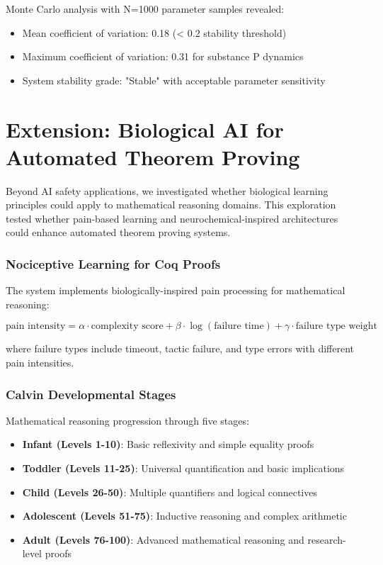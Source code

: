 \documentclass[12pt]{article}
\begin{document}
Monte Carlo analysis with N=1000 parameter samples revealed:
\begin{itemize}
\item Mean coefficient of variation: 0.18 (< 0.2 stability threshold)
\item Maximum coefficient of variation: 0.31 for substance P dynamics
\item System stability grade: "Stable" with acceptable parameter sensitivity
\end{itemize}

\section{Extension: Biological AI for Automated Theorem Proving}

Beyond AI safety applications, we investigated whether biological learning principles could apply to mathematical reasoning domains. This exploration tested whether pain-based learning and neurochemical-inspired architectures could enhance automated theorem proving systems.

\subsubsection{Nociceptive Learning for Coq Proofs}

The system implements biologically-inspired pain processing for mathematical reasoning:

\begin{equation}
\text{pain intensity} = \alpha \cdot \text{complexity score} + \beta \cdot \log(\text{failure time}) + \gamma \cdot \text{failure type weight}
\end{equation}

where failure types include timeout, tactic failure, and type errors with different pain intensities.

\subsubsection{Calvin Developmental Stages}

Mathematical reasoning progression through five stages:
\begin{itemize}
\item \textbf{Infant (Levels 1-10)}: Basic reflexivity and simple equality proofs
\item \textbf{Toddler (Levels 11-25)}: Universal quantification and basic implications
\item \textbf{Child (Levels 26-50)}: Multiple quantifiers and logical connectives
\item \textbf{Adolescent (Levels 51-75)}: Inductive reasoning and complex arithmetic
\item \textbf{Adult (Levels 76-100)}: Advanced mathematical reasoning and research-level proofs
\end{itemize}
\end{document}
